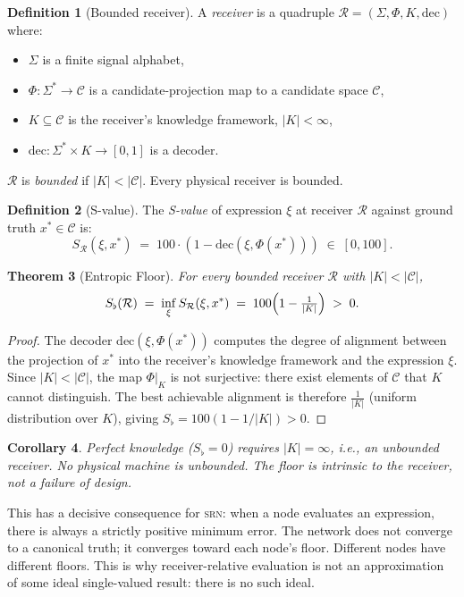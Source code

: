 \documentclass[twocolumn,11pt,a4paper]{article}
\newtheorem{theorem}{Theorem}[section]
\newtheorem{corollary}[theorem]{Corollary}
\theoremstyle{definition}
\newtheorem{definition}[theorem]{Definition}
\theoremstyle{remark}
\newcommand{\srn}{\textsc{srn}}
\newcommand{\Recv}{\mathcal{R}}
\newcommand{\floor}{S_{\flat}}
\begin{document}
\begin{definition}[Bounded receiver]
\label{def:receiver}
A \emph{receiver} is a quadruple $\Recv = (\Sigma, \Phi, K,
\mathrm{dec})$ where:
\begin{itemize}[noitemsep,topsep=1pt]
\item $\Sigma$ is a finite signal alphabet,
\item $\Phi : \Sigma^* \to \mathscr{C}$ is a candidate-projection map
  to a candidate space $\mathscr{C}$,
\item $K \subseteq \mathscr{C}$ is the receiver's knowledge framework,
  $|K| < \infty$,
\item $\mathrm{dec} : \Sigma^* \times K \to [0,1]$ is a decoder.
\end{itemize}
$\Recv$ is \emph{bounded} if $|K| < |\mathscr{C}|$.  Every physical
receiver is bounded.
\end{definition}

\begin{definition}[S-value]
The \emph{S-value} of expression $\xi$ at receiver $\Recv$ against
ground truth $x^* \in \mathscr{C}$ is:
\[
S_\Recv(\xi, x^*) \;=\; 100 \cdot (1 - \mathrm{dec}(\xi, \Phi(x^*)))
\;\in\; [0,100].
\]
\end{definition}

\begin{theorem}[Entropic Floor]
\label{thm:floor}
For every bounded receiver $\Recv$ with $|K| < |\mathscr{C}|$,
\[
\floor(\Recv) \;=\; \inf_{\xi} S_\Recv(\xi, x^*) \;=\;
100\Bigl(1 - \tfrac{1}{|K|}\Bigr) \;>\; 0.
\]
\end{theorem}
\begin{proof}
The decoder $\mathrm{dec}(\xi, \Phi(x^*))$ computes the degree of
alignment between the projection of $x^*$ into the receiver's knowledge
framework and the expression $\xi$.  Since $|K| < |\mathscr{C}|$, the
map $\Phi|_K$ is not surjective: there exist elements of $\mathscr{C}$
that $K$ cannot distinguish.  The best achievable alignment is therefore
$\tfrac{1}{|K|}$ (uniform distribution over $K$), giving
$\floor = 100(1 - 1/|K|) > 0$.
\end{proof}

\begin{corollary}
\label{cor:floor}
Perfect knowledge ($\floor = 0$) requires $|K| = \infty$, i.e., an
unbounded receiver.  No physical machine is unbounded.  The floor is
intrinsic to the receiver, not a failure of design.
\end{corollary}

This has a decisive consequence for \srn: when a node evaluates an
expression, there is always a strictly positive minimum error.  The
network does not converge to a canonical truth; it converges toward each
node's floor.  Different nodes have different floors.  This is why
receiver-relative evaluation is not an approximation of some ideal
single-valued result: there is no such ideal.
\end{document}
